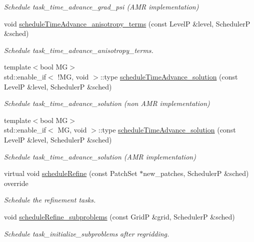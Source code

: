 \begin{DoxyCompactItemize}
\begin{DoxyCompactList}\small\item\em Schedule task\+\_\+time\+\_\+advance\+\_\+grad\+\_\+psi (A\+MR implementation) \end{DoxyCompactList}\item 
void \hyperlink{classUintah_1_1PhaseField_1_1PureMetal_a8663499001f2e89f6ce1c9b1084fc3c5}{schedule\+Time\+Advance\+\_\+anisotropy\+\_\+terms} (const LevelP \&level, SchedulerP \&sched)
\begin{DoxyCompactList}\small\item\em Schedule task\+\_\+time\+\_\+advance\+\_\+anisotropy\+\_\+terms. \end{DoxyCompactList}\item 
{\footnotesize template$<$bool MG$>$ }\\std\+::enable\+\_\+if$<$ !MG, void $>$\+::type \hyperlink{classUintah_1_1PhaseField_1_1PureMetal_ab026cd5b66042139121875ff1a7d1137}{schedule\+Time\+Advance\+\_\+solution} (const LevelP \&level, SchedulerP \&sched)
\begin{DoxyCompactList}\small\item\em Schedule task\+\_\+time\+\_\+advance\+\_\+solution (non A\+MR implementation) \end{DoxyCompactList}\item 
{\footnotesize template$<$bool MG$>$ }\\std\+::enable\+\_\+if$<$ MG, void $>$\+::type \hyperlink{classUintah_1_1PhaseField_1_1PureMetal_ab026cd5b66042139121875ff1a7d1137}{schedule\+Time\+Advance\+\_\+solution} (const LevelP \&level, SchedulerP \&sched)
\begin{DoxyCompactList}\small\item\em Schedule task\+\_\+time\+\_\+advance\+\_\+solution (A\+MR implementation) \end{DoxyCompactList}\item 
virtual void \hyperlink{classUintah_1_1PhaseField_1_1PureMetal_adac60105aa32fa2d78a379e4fadb0f6d}{schedule\+Refine} (const Patch\+Set $\ast$new\+\_\+patches, SchedulerP \&sched) override
\begin{DoxyCompactList}\small\item\em Schedule the refinement tasks. \end{DoxyCompactList}\item 
void \hyperlink{classUintah_1_1PhaseField_1_1PureMetal_ae742f1e0b6f940c346d21bee750bd206}{schedule\+Refine\+\_\+subproblems} (const GridP \&grid, SchedulerP \&sched)
\begin{DoxyCompactList}\small\item\em Schedule task\+\_\+initialize\+\_\+subproblems after regridding. \end{DoxyCompactList}\item 

\end{DoxyCompactItemize}
